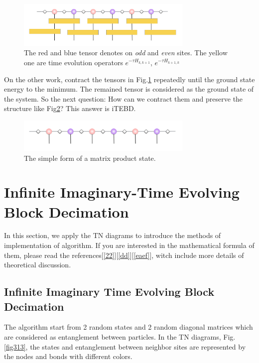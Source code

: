 \begin{figure}[ht]
	\centering
	\includegraphics[width=0.75\textwidth]{figures/fig312.png}
	\caption[The picture of the main idea of itebd.]{The red and blue tensor denotes on \textit{odd} and \textit{even} sites. The yellow one are time evolution operators $e^{-\tau H_{k,k+1}}$, $e^{-\tau H_{k+1,k}}$}
	\label{fig312}
\end{figure}

On the other work, contract the tensors in Fig.\ref{fig312} repeatedly until the ground state energy to the minimum. The remained tensor is considered as the ground state of the system. So the next question: How can we contract them and preserve the structure like Fig{\ref{fig311}}? This answer is iTEBD.

\begin{figure}[ht]
	\centering
	\includegraphics[width=0.75\textwidth]{figures/fig311.png}
	\caption[The picture of matrix product states]{The simple form of a matrix product state.}
	\label{fig311}
\end{figure}

\section{Infinite Imaginary-Time Evolving Block Decimation}
In this section, we apply the TN diagrams to introduce the methods of implementation of algorithm. If you are interested in the mathematical formula of them, please read the references[\ref{22}][\ref{dd}][\ref{eaef}], witch include more details of theoretical discussion.

\label{itebd}
\subsection{Infinite Imaginary Time Evolving Block Decimation}

The algorithm start from 2 random states and 2 random diagonal matrices which are considered as entanglement between particles. In the TN diagrams, Fig.\ref{fig313}, the states and entanglement between neighbor sites are represented by the nodes and bonds with different colors.


